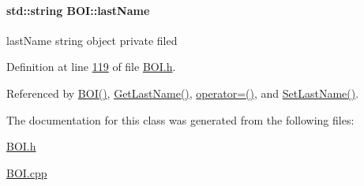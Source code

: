 \paragraph[{\texorpdfstring{last\+Name}{lastName}}]{\setlength{\rightskip}{0pt plus 5cm}std\+::string B\+O\+I\+::last\+Name\hspace{0.3cm}{\ttfamily [private]}}\hypertarget{class_b_o_i_ad51bfa6f28816c7f5036447ff809cecf_ad51bfa6f28816c7f5036447ff809cecf}{}\label{class_b_o_i_ad51bfa6f28816c7f5036447ff809cecf_ad51bfa6f28816c7f5036447ff809cecf}
last\+Name string object private filed 

Definition at line \hyperlink{_b_o_i_8h_source_l00119}{119} of file \hyperlink{_b_o_i_8h_source}{B\+O\+I.\+h}.



Referenced by \hyperlink{_b_o_i_8h_source_l00029}{B\+O\+I()}, \hyperlink{_b_o_i_8cpp_source_l00108}{Get\+Last\+Name()}, \hyperlink{_b_o_i_8h_source_l00078}{operator=()}, and \hyperlink{_b_o_i_8cpp_source_l00102}{Set\+Last\+Name()}.



The documentation for this class was generated from the following files\+:\begin{DoxyCompactItemize}
\item 
\hyperlink{_b_o_i_8h}{B\+O\+I.\+h}\item 
\hyperlink{_b_o_i_8cpp}{B\+O\+I.\+cpp}\end{DoxyCompactItemize}
